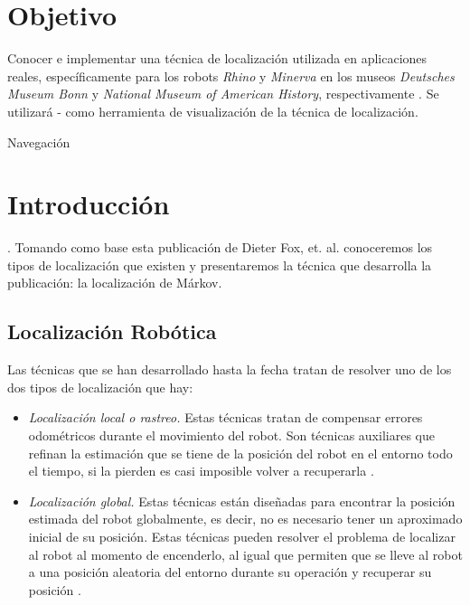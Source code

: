 \section{Objetivo}

Conocer e implementar una técnica de localización utilizada en aplicaciones reales, específicamente para los robots \textit{Rhino} y \textit{Minerva} en los museos \textit{Deutsches Museum Bonn} y \textit{National Museum of American History}, respectivamente \parencite{Dieter1999}. Se utilizará \Java- como herramienta de visualización de la técnica de localización.

\begin{auxcode}
 \caption{Navegación}
 \centering
\end{auxcode}


\section{Introducci\'on}

 \parencite{Dieter1999}. Tomando como base esta publicación de Dieter Fox, et. al. conoceremos los tipos de localización que existen y presentaremos la técnica que desarrolla la publicación: la localización de Márkov.

\subsection{Localización Robótica}

Las técnicas que se han desarrollado hasta la fecha tratan de resolver uno de los dos tipos de localización que hay:

\begin{itemize}
  \item \textit{Localización local o rastreo.} Estas técnicas tratan de compensar errores odométricos durante el movimiento del robot. Son técnicas auxiliares que refinan la estimación que se tiene de la posición del robot en el entorno todo el tiempo, si la pierden es casi imposible volver a recuperarla \parencite{Dieter1999}.
  \item \textit{Localización global.} Estas técnicas están diseñadas para encontrar la posición estimada del robot globalmente, es decir, no es necesario tener un aproximado inicial de su posición. Estas técnicas pueden resolver el problema de localizar al robot al momento de encenderlo, al igual que permiten que se lleve al robot a una posición aleatoria del entorno durante su operación y recuperar su posición \parencite{Dieter1999}.
\end{itemize}

